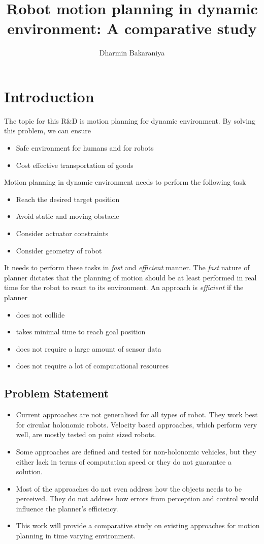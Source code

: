 \documentclass[rnd]{mas_proposal}
\title{Robot motion planning in dynamic environment: A comparative study}
\author{Dharmin Bakaraniya}
\begin{document}
\maketitle

\pagestyle{plain}

\chapter{Introduction}
The topic for this R\&D is motion planning for dynamic environment. 
By solving this problem, we can ensure 
\begin{itemize}
    \item Safe environment for humans and for robots
    \item Cost effective transportation of goods
\end{itemize}
Motion planning in dynamic environment needs to perform the following task
\begin{itemize}
    \item Reach the desired target position
    \item Avoid static and moving obstacle
    \item Consider actuator constraints
    \item Consider geometry of robot
\end{itemize}
It needs to perform these tasks in \textit{fast} and \textit{efficient} manner. 
The \textit{fast} nature of planner dictates that the planning of motion should be at least performed in real time for the robot to react to its environment. 
An approach is \textit{efficient} if the planner
\begin{itemize}
    \item does not collide
    \item takes minimal time to reach goal position
    \item does not require a large amount of sensor data
    \item does not require a lot of computational resources
\end{itemize}

\section{Problem Statement}
\begin{itemize}
    \item Current approaches are not generalised for all types of robot. They work best for circular holonomic robots. Velocity based approaches, which perform very well, are mostly tested on point sized robots.
    \item Some approaches are defined and tested for non-holonomic vehicles, but they either lack in terms of computation speed or they do not guarantee a solution.
    \item Most of the approaches do not even address how the objects needs to be perceived. They do not address how errors from perception and control would influence the planner's efficiency.
    \item This work will provide a comparative study on existing approaches for motion planning in time varying environment.
\end{itemize}
\end{document}
